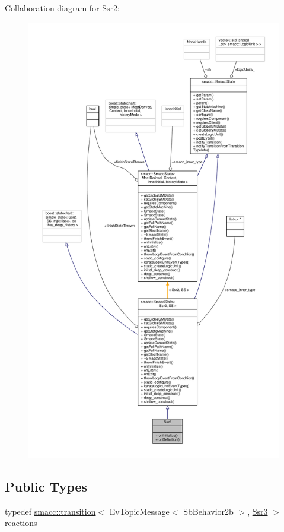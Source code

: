 Collaboration diagram for Ssr2\+:
\nopagebreak
\begin{figure}[H]
\begin{center}
\leavevmode
\includegraphics[height=550pt]{structSsr2__coll__graph}
\end{center}
\end{figure}
\subsection*{Public Types}
\begin{DoxyCompactItemize}
\item 
typedef \hyperlink{classsmacc_1_1transition}{smacc\+::transition}$<$ Ev\+Topic\+Message$<$ Sb\+Behavior2b $>$, \hyperlink{structSsr3}{Ssr3} $>$ \hyperlink{structSsr2_a70cc14170685fc98f9256e45cdc058c0}{reactions}
\end{DoxyCompactItemize}
